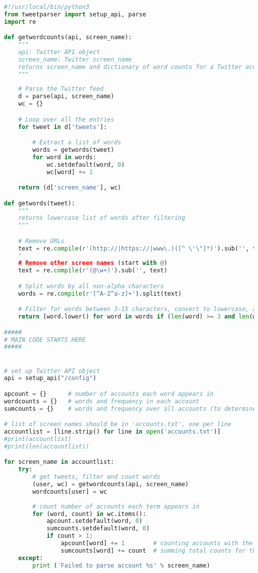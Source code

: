 \documentclass[12pt]{article}
\begin{document}
\begin{lstlisting}[language=Python, caption=generatetweetvector.py , label=2nd:copy]
#!/usr/local/bin/python3
from tweetparser import setup_api, parse
import re

def getwordcounts(api, screen_name):
    """
    api: Twitter API object
    screen_name: Twitter screen_name
    returns screen_name and dictionary of word counts for a Twitter account
    """
    
    # Parse the Twitter feed
    d = parse(api, screen_name)
    wc = {}

    # Loop over all the entries
    for tweet in d['tweets']:

        # Extract a list of words
        words = getwords(tweet)
        for word in words:
            wc.setdefault(word, 0)
            wc[word] += 1

    return (d['screen_name'], wc)

def getwords(tweet):
    """
    returns lowercase list of words after filtering
    """

    # Remove URLs
    text = re.compile(r'(http://|https://|www\.)([^ \'\"]*)').sub('', tweet)
    "
    # Remove other screen names (start with @)
    text = re.compile(r'(@\w+)').sub('', text)

    # Split words by all non-alpha characters
    words = re.compile(r'[^A-Z^a-z]+').split(text)

    # Filter for words between 3-15 characters, convert to lowercase, and return as a list
    return [word.lower() for word in words if (len(word) >= 3 and len(word) <= 15)]

#####
# MAIN CODE STARTS HERE
#####


# set up Twitter API object
api = setup_api("/config")

apcount = {}      # number of accounts each word appears in
wordcounts = {}   # words and frequency in each account
sumcounts = {}    # words and frequency over all accounts (to determine most popular)

# list of screen names should be in 'accounts.txt', one per line
accountlist = [line.strip() for line in open('accounts.txt')]
#print(accountlist)
#print(len(accountlist))

for screen_name in accountlist:
    try:
        # get tweets, filter and count words
        (user, wc) = getwordcounts(api, screen_name)
        wordcounts[user] = wc
        
        # count number of accounts each term appears in
        for (word, count) in wc.items():
            apcount.setdefault(word, 0)
            sumcounts.setdefault(word, 0)
            if count > 1:
                apcount[word] += 1        # counting accounts with the word
                sumcounts[word] += count  # summing total counts for the word
    except:
        print ('Failed to parse account %s' % screen_name)
        


\end{lstlisting}
\end{document}
